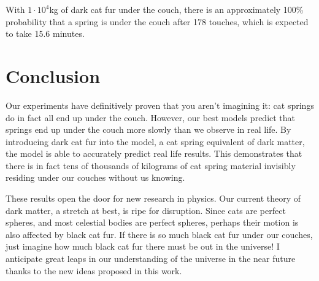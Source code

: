 \documentclass[twocolumn]{article}
\begin{document}
With $1 \cdot 10^4$kg of dark cat fur under the couch, there is an approximately 100\% probability that a spring is under the couch after 178 touches, which is expected to take 15.6 minutes.

\section{Conclusion}

Our experiments have definitively proven that you aren't imagining it: cat springs do in fact all end up under the couch. However, our best models predict that springs end up under the couch more slowly than we observe in real life. By introducing dark cat fur into the model, a cat spring equivalent of dark matter, the model is able to accurately predict real life results. This demonstrates that there is in fact tens of thousands of kilograms of cat spring material invisibly residing under our couches without us knowing.

These results open the door for new research in physics. Our current theory of dark matter, a stretch at best, is ripe for disruption. Since cats are perfect spheres, and most celestial bodies are perfect spheres, perhaps their motion is also affected by black cat fur. If there is so much black cat fur under our couches, just imagine how much black cat fur there must be out in the universe! I anticipate great leaps in our understanding of the universe in the near future thanks to the new ideas proposed in this work.

% 
% 
\end{document}
